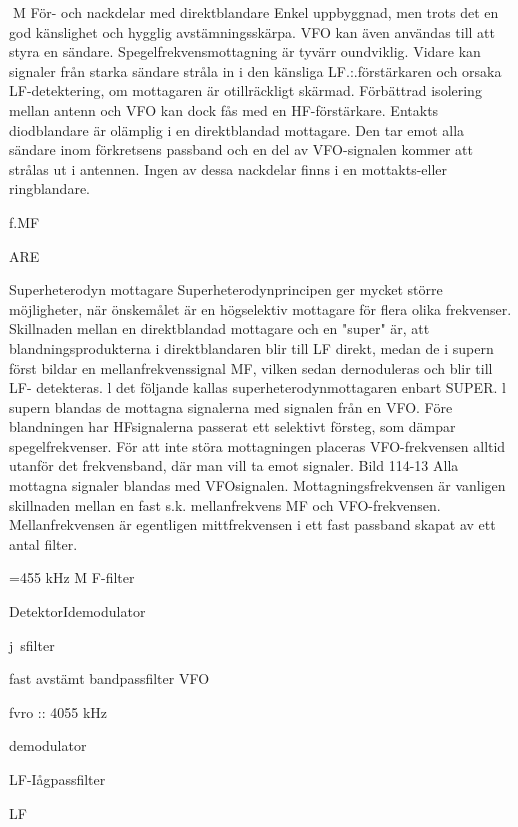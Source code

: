 M
För- och nackdelar med direktblandare
Enkel uppbyggnad, men trots det en god
känslighet och hygglig avstämningsskärpa.
VFO kan även användas till att styra en
sändare.
Spegelfrekvensmottagning är tyvärr
oundviklig. Vidare kan signaler från starka
sändare stråla in i den känsliga LF.:.förstärkaren och orsaka LF-detektering, om mottagaren är otillräckligt skärmad. Förbättrad
isolering mellan antenn och VFO kan dock
fås med en HF-förstärkare.
Entakts diodblandare är olämplig i en
direktblandad mottagare. Den tar emot alla
sändare inom förkretsens passband och en
del av VFO-signalen kommer att strålas ut i
antennen. Ingen av dessa nackdelar finns i
en mottakts-eller ringblandare.

f.MF

ARE

Superheterodyn mottagare
Superheterodynprincipen ger mycket större möjligheter, när önskemålet är en högselektiv mottagare för flera olika frekvenser.
Skillnaden mellan en direktblandad mottagare och en "super" är, att blandningsprodukterna i direktblandaren blir till LF direkt, medan de i supern först bildar en
mellanfrekvenssignal MF, vilken sedan
dernoduleras och blir till LF- detekteras.
l det följande kallas superheterodynmottagaren enbart SUPER. l supern blandas de mottagna signalerna med signalen
från en VFO. Före blandningen har HFsignalerna passerat ett selektivt försteg, som
dämpar spegelfrekvenser. För att inte störa
mottagningen placeras VFO-frekvensen alltid utanför det frekvensband, där man vill ta
emot signaler.
Bild 114-13
Alla mottagna signaler blandas med VFOsignalen. Mottagningsfrekvensen är vanligen skillnaden mellan en fast s.k. mellanfrekvens MF och VFO-frekvensen. Mellanfrekvensen är egentligen mittfrekvensen i
ett fast passband skapat av ett antal filter.

=455 kHz
M F-filter

DetektorIdemodulator

j~sfilter

fast avstämt bandpassfilter
VFO

fvro :: 4055 kHz

demodulator

LF-Iågpassfilter

LF

